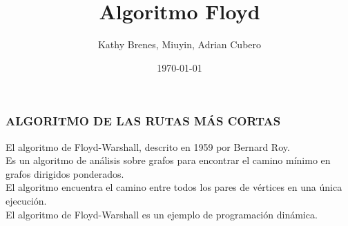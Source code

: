 \documentclass{beamer}
\begin{document}
\title{Algoritmo Floyd}
 \author{Kathy Brenes, Miuyin, Adrian Cubero}
\date{\today}
 \frame{\titlepage}
 \begin{frame}
\color{black}
\frametitle{ALGORITMO DE LAS RUTAS M\'AS CORTAS}
El algoritmo de Floyd-Warshall, descrito en 1959 por Bernard Roy.
\\Es un algoritmo de análisis sobre grafos para encontrar el camino mínimo en grafos dirigidos ponderados.
\\El algoritmo encuentra el camino entre todos los pares de vértices en una única ejecución.
\\ El algoritmo de Floyd-Warshall es un ejemplo de programación dinámica.
\end{frame} 
\end{document}

